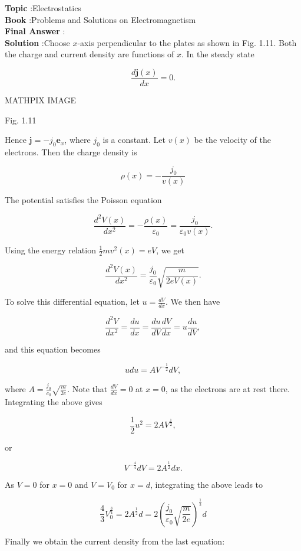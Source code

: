 \documentclass[10pt]{article}
\begin{document}
\textbf{Topic} :Electrostatics\\
\textbf{Book} :Problems and Solutions on Electromagnetism\\
\textbf{Final Answer} : \\


\textbf{Solution} :Choose $x$-axis perpendicular to the plates as shown in Fig. 1.11. Both the charge and current density are functions of $x$. In the steady state

$$
\frac{d \mathbf{j}(x)}{d x}=0 .
$$

MATHPIX IMAGE

Fig. 1.11

Hence $\mathbf{j}=-j_{0} \mathbf{e}_{x}$, where $j_{0}$ is a constant. Let $v(x)$ be the velocity of the electrons. Then the charge density is

$$
\rho(x)=-\frac{j_{0}}{v(x)}
$$

The potential satisfies the Poisson equation

$$
\frac{d^{2} V(x)}{d x^{2}}=-\frac{\rho(x)}{\varepsilon_{0}}=\frac{j_{0}}{\varepsilon_{0} v(x)} .
$$

Using the energy relation $\frac{1}{2} m v^{2}(x)=e V$, we get

$$
\frac{d^{2} V(x)}{d x^{2}}=\frac{j_{0}}{\varepsilon_{0}} \sqrt{\frac{m}{2 e V(x)}} .
$$

To solve this differential equation, let $u=\frac{d V}{d x}$. We then have

$$
\frac{d^{2} V}{d x^{2}}=\frac{d u}{d x}=\frac{d u}{d V} \frac{d V}{d x}=u \frac{d u}{d V},
$$

and this equation becomes

$$
u d u=A V^{-\frac{1}{2}} d V,
$$

where $A=\frac{j_{0}}{c_{0}} \sqrt{\frac{m}{2 e}}$. Note that $\frac{d V}{d x}=0$ at $x=0$, as the electrons are at rest there. Integrating the above gives

$$
\frac{1}{2} u^{2}=2 A V^{\frac{1}{2}},
$$

or

$$
V^{-\frac{4}{4}} d V=2 A^{\frac{1}{2}} d x .
$$

As $V=0$ for $x=0$ and $V=V_{0}$ for $x=d$, integrating the above leads to

$$
\frac{4}{3} V_{0}^{\frac{3}{4}}=2 A^{\frac{1}{2}} d=2\left(\frac{j_{0}}{\varepsilon_{0}} \sqrt{\frac{m}{2 e}}\right)^{\frac{1}{2}} d
$$

Finally we obtain the current density from the last equation:
\end{document}
